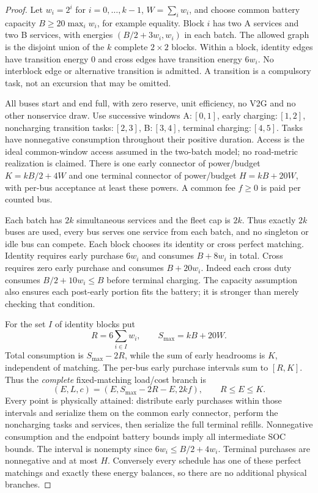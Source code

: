 \begin{proof}
Let $w_i=2^i$ for $i=0,\ldots,k-1$, $W=\sum_iw_i$, and choose common
battery capacity $B\ge20\max_iw_i$, for example equality. Block $i$ has
two A services and two B services, with energies $(B/2+3w_i,w_i)$ in
each batch. The allowed graph is the disjoint union of the $k$ complete
$2\times2$ blocks. Within a block, identity edges have transition energy 0
and cross edges have transition energy $6w_i$. No interblock edge or
alternative transition is admitted. A transition is a compulsory task,
not an excursion that may be omitted.

All buses start and end full, with zero reserve, unit efficiency, no V2G
and no other nonservice draw. Use successive windows A$:[0,1]$,
early charging$:[1,2]$, noncharging transition tasks$:[2,3]$,
B$:[3,4]$, terminal charging$:[4,5]$. Tasks have nonnegative consumption
throughout their positive duration. Access is the ideal common-window
access assumed in the two-batch model; no road-metric realization is
claimed. There is one early connector of power/budget
$K=kB/2+4W$ and one terminal connector of power/budget
$H=kB+20W$, with per-bus acceptance at least these powers. A common
fee $f\ge0$ is paid per counted bus.

Each batch has $2k$ simultaneous services and the fleet cap is $2k$.
Thus exactly $2k$ buses are used, every bus serves one service from each
batch, and no singleton or idle bus can compete. Each block chooses its
identity or cross perfect matching. Identity requires early purchase
$6w_i$ and consumes $B+8w_i$ in total. Cross requires zero early purchase
and consumes $B+20w_i$. Indeed each cross duty consumes
$B/2+10w_i\le B$ before terminal charging. The capacity assumption also
ensures each post-early portion fits the battery; it is stronger than
merely checking that condition.

For the set $I$ of identity blocks put
\[
 R=6\sum_{i\in I}w_i,\qquad S_{\max}=kB+20W.
\]
Total consumption is $S_{\max}-2R$, while the sum of early headrooms is
$K$, independent of matching. The per-bus early purchase intervals sum
to $[R,K]$. Thus the \emph{complete} fixed-matching load/cost branch is
\[
 (E,L,c)=(E,S_{\max}-2R-E,2kf),\qquad R\le E\le K.
\]
Every point is physically attained: distribute early purchases within
those intervals and serialize them on the common early connector, perform
the noncharging tasks and services, then serialize the full terminal
refills. Nonnegative consumption and the endpoint battery bounds imply
all intermediate SOC bounds. The interval is nonempty since
$6w_i\le B/2+4w_i$. Terminal purchases are nonnegative and at most $H$.
Conversely every schedule has one of these perfect matchings and exactly
these energy balances, so there are no additional physical branches.


\end{proof}
